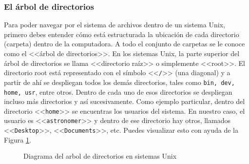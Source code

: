 \subsubsection{El árbol de directorios}
Para poder navegar por el sistema de archivos dentro de un sistema Unix, primero debes entender cómo está estructurada la ubicación de cada directorio (carpeta) dentro de la computadora. A todo el conjunto de carpetas se le conoce como el <<árbol de directorios>>. En los sistemas Unix, la parte superior del árbol de directorios se llama <<directorio raíz>> o simplemente <<root>>. El directorio root está representado con el símbolo <<\texttt{/}>> (una diagonal) y a partir de ahí se despliegan todos los demás directorios, tales como \texttt{bin, dev, home, usr}, entre otros. Dentro de cada uno de esos directorios se despliegan incluso más directorios y así sucesivamente. Como ejemplo particular, dentro del directorio <<\texttt{home}>> se encuentras los usuarios del sistema. En nuestro caso, el usuario es <<\texttt{astronomer}>> y dentro de ese directorio hay otros, llamados <<\texttt{Desktop}>>, <<\texttt{Documents}>>, etc. Puedes visualizar esto con ayuda de la Figura \ref{fig:unix-tree}.

\begin{figure}[htb]
    \centering


    \caption{Diagrama del arbol de directorios en sistemas Unix}
    \label{fig:unix-tree}
\end{figure}

